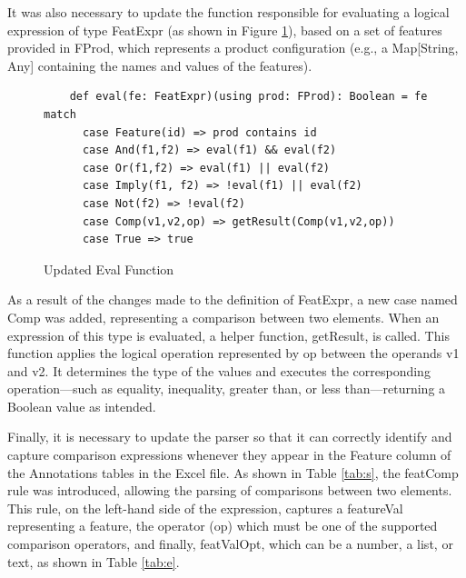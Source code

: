 It was also necessary to update the function responsible for evaluating a logical expression of type FeatExpr (as shown in Figure \ref{fig:Eval}), based on a set of features provided in FProd, which represents a product configuration (e.g., a Map[String, Any] containing the names and values of the features).


\begin{figure}[H]
\centering
\begin{minipage}{0.9\linewidth}
\begin{verbatim}
    def eval(fe: FeatExpr)(using prod: FProd): Boolean = fe match
      case Feature(id) => prod contains id
      case And(f1,f2) => eval(f1) && eval(f2)
      case Or(f1,f2) => eval(f1) || eval(f2)
      case Imply(f1, f2) => !eval(f1) || eval(f2)
      case Not(f2) => !eval(f2)
      case Comp(v1,v2,op) => getResult(Comp(v1,v2,op))
      case True => true
\end{verbatim}
\end{minipage}
\caption{Updated Eval Function}
\label{fig:Eval}
\end{figure}

As a result of the changes made to the definition of FeatExpr, a new case named Comp was added, representing a comparison between two elements. When an expression of this type is evaluated, a helper function, getResult, is called. This function applies the logical operation represented by op between the operands v1 and v2. It determines the type of the values and executes the corresponding operation—such as equality, inequality, greater than, or less than—returning a Boolean value as intended.

Finally, it is necessary to update the parser so that it can correctly identify and capture comparison expressions whenever they appear in the Feature column of the Annotations tables in the Excel file. As shown in Table \ref{tab:s}, the featComp rule was introduced, allowing the parsing of comparisons between two elements. This rule, on the left-hand side of the expression, captures a featureVal representing a feature, the operator (op) which must be one of the supported comparison operators, and finally, featValOpt, which can be a number, a list, or text, as shown in Table \ref{tab:e}.



